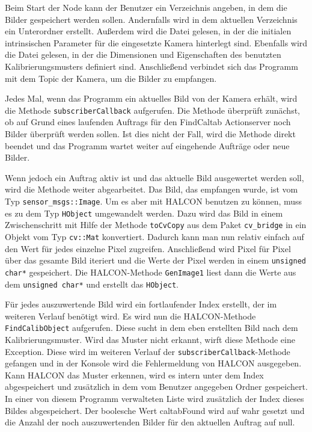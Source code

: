 Beim Start der Node kann der Benutzer ein Verzeichnis angeben, in dem die Bilder gespeichert werden sollen. Andernfalls wird in dem aktuellen Verzeichnis ein Unterordner erstellt. Außerdem wird die Datei gelesen, in der die initialen intrinsischen Parameter für die eingesetzte Kamera hinterlegt sind. Ebenfalls wird die Datei gelesen, in der die Dimensionen und Eigenschaften des benutzten Kalibrierungsmusters definiert sind.  Anschließend verbindet sich das Programm mit dem Topic der Kamera, um die Bilder zu empfangen.

Jedes Mal, wenn das Programm ein aktuelles Bild von der Kamera erhält, wird die Methode \texttt{subscriberCallback} aufgerufen. Die Methode überprüft zunächst, ob auf Grund eines laufenden Auftrags für den FindCaltab Actionserver noch Bilder überprüft werden sollen. Ist dies nicht der Fall, wird die Methode direkt beendet und das Programm wartet weiter auf eingehende Aufträge oder neue Bilder. 

Wenn jedoch ein Auftrag aktiv ist und das aktuelle Bild ausgewertet werden soll, wird die Methode weiter abgearbeitet. Das Bild, das empfangen wurde, ist vom Typ \texttt{sensor\_msgs::Image}. Um es aber mit HALCON benutzen zu können, muss es zu dem Typ \texttt{HObject} umgewandelt werden. Dazu wird das Bild in einem Zwischenschritt mit Hilfe der Methode \texttt{toCvCopy} aus dem Paket \texttt{cv\_bridge} in ein Objekt vom Typ \texttt{cv::Mat} konvertiert. Dadurch kann man nun relativ einfach auf den Wert für jedes einzelne Pixel zugreifen. Anschließend wird Pixel für Pixel über das gesamte Bild iteriert und die Werte der Pixel werden in einem \texttt{unsigned char*} gespeichert. Die HALCON-Methode \texttt{GenImage1} liest dann die Werte aus dem \texttt{unsigned char*} und erstellt das \texttt{HObject}.

Für jedes auszuwertende Bild wird ein fortlaufender Index erstellt, der im weiteren Verlauf benötigt wird. Es wird nun die HALCON-Methode \texttt{FindCalibObject} aufgerufen. Diese sucht in dem eben erstellten Bild nach dem Kalibrierungsmuster. Wird das Muster nicht erkannt, wirft diese Methode eine Exception. Diese wird im weiteren Verlauf der \texttt{subscriberCallback}-Methode gefangen und in der Konsole wird die Fehlermeldung von HALCON ausgegeben. Kann HALCON das Muster erkennen, wird es intern unter dem Index abgespeichert und zusätzlich in dem vom Benutzer angegeben Ordner gespeichert. In einer von diesem Programm verwalteten Liste wird zusätzlich der Index dieses Bildes abgespeichert. Der boolesche Wert caltabFound wird auf wahr gesetzt und die Anzahl der noch auszuwertenden Bilder für den aktuellen Auftrag auf null. 

